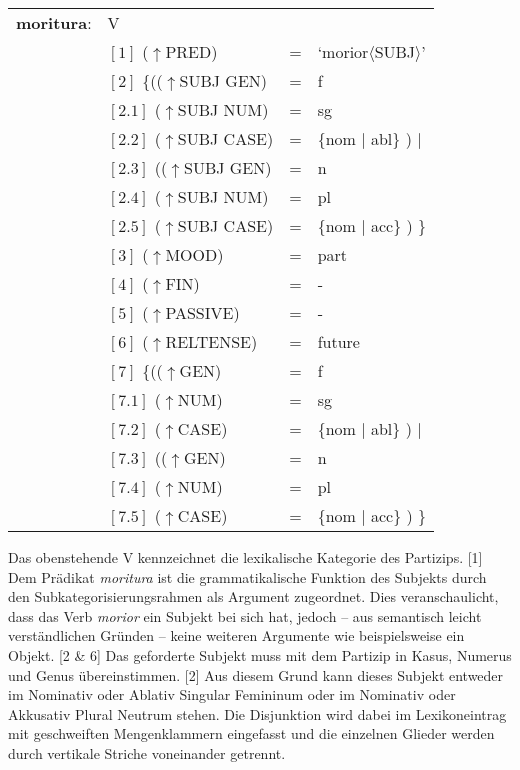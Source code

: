 \documentclass[12pt,a4paper]{article}
\begin{document}
\begin{singlespace}
\begin{tabular}{ l  l  l  l  } 
\textbf{moritura}: & V \\
$\qquad$ & $[1]$ \:  ($\uparrow$PRED) & = & `morior$\langle$SUBJ$\rangle$'\\
$\qquad$ & $[2]$ \:  \{(($\uparrow$SUBJ GEN) & = & f \\ 
$\qquad$ & $[2.1]$ \:  ($\uparrow$SUBJ NUM) & = & sg \\
$\qquad$ & $[2.2]$ \:  ($\uparrow$SUBJ CASE) & = & \{nom $\mid$ abl\} ) $\mid$\\
$\qquad$ & $[2.3]$ \: (($\uparrow$SUBJ GEN) & = & n \\
$\qquad$ & $[2.4]$ \:  ($\uparrow$SUBJ NUM) & = & pl \\
$\qquad$ & $[2.5]$ \:  ($\uparrow$SUBJ CASE) & = & \{nom $\mid$ acc\} ) \}\\
$\qquad$ & $[3]$ \:  ($\uparrow$MOOD) & = & part\\
$\qquad$ & $[4]$ \:  ($\uparrow$FIN) & = & - \\
$\qquad$ & $[5]$ \:  ($\uparrow$PASSIVE) & = & - \\
$\qquad$ & $[6]$ \:  ($\uparrow$RELTENSE) & = & future \\
$\qquad$ & $[7]$ \:  \{(($\uparrow$GEN) & = & f \\ 
$\qquad$ & $[7.1]$ \:  ($\uparrow$NUM) & = & sg \\
$\qquad$ & $[7.2]$ \:  ($\uparrow$CASE) & = & \{nom $\mid$ abl\} ) $\mid$\\
$\qquad$ & $[7.3]$ \: (($\uparrow$GEN) & = & n \\
$\qquad$ & $[7.4]$ \:  ($\uparrow$NUM) & = & pl \\
$\qquad$ & $[7.5]$ \:  ($\uparrow$CASE) & = & \{nom $\mid$ acc\} ) \}\\
\end{tabular}
\newline
\newline
\end{singlespace}

Das obenstehende V kennzeichnet die lexikalische Kategorie des Partizips. [1] Dem Prädikat \textit{moritura} ist die grammatikalische Funktion des Subjekts durch den Subkategorisierungsrahmen als Argument zugeordnet. Dies veranschaulicht, dass das Verb \textit{morior} ein Subjekt bei sich hat, jedoch -- aus semantisch leicht verständlichen Gründen -- keine weiteren Argumente wie beispielsweise ein Objekt.
[2 \& 6] Das geforderte Subjekt muss mit dem Partizip in Kasus, Numerus und Genus übereinstimmen. [2] Aus diesem Grund kann dieses Subjekt entweder im Nominativ oder Ablativ Singular Femininum oder im Nominativ oder Akkusativ Plural Neutrum stehen. Die Disjunktion wird dabei im Lexikoneintrag mit geschweiften Mengenklammern eingefasst und die einzelnen Glieder werden durch vertikale Striche voneinander getrennt.
\end{document}
